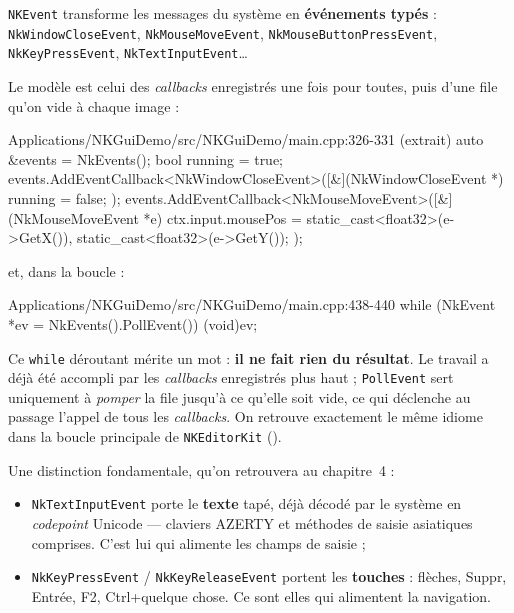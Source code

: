 \texttt{NKEvent} transforme les messages du système en \textbf{événements
typés} : \texttt{NkWindowCloseEvent}, \texttt{NkMouseMoveEvent},
\texttt{NkMouseButtonPressEvent}, \texttt{NkKeyPressEvent},
\texttt{NkTextInputEvent}\dots

Le modèle est celui des \emph{callbacks} enregistrés une fois pour toutes, puis
d'une file qu'on vide à chaque image :

\begin{nkcode}{Applications/NKGuiDemo/src/NKGuiDemo/main.cpp:326-331 (extrait)}
    auto &events = NkEvents();
    bool running = true;
    events.AddEventCallback<NkWindowCloseEvent>([&](NkWindowCloseEvent *) { running = false; });
    events.AddEventCallback<NkMouseMoveEvent>([&](NkMouseMoveEvent *e) {
        ctx.input.mousePos = {static_cast<float32>(e->GetX()), static_cast<float32>(e->GetY())};
    });
\end{nkcode}

et, dans la boucle :

\begin{nkcode}{Applications/NKGuiDemo/src/NKGuiDemo/main.cpp:438-440}
        while (NkEvent *ev = NkEvents().PollEvent()) {
            (void)ev;
        }
\end{nkcode}

Ce \texttt{while} déroutant mérite un mot : \textbf{il ne fait rien du résultat}.
Le travail a déjà été accompli par les \emph{callbacks} enregistrés plus haut ;
\texttt{PollEvent} sert uniquement à \emph{pomper} la file jusqu'à ce qu'elle
soit vide, ce qui déclenche au passage l'appel de tous les \emph{callbacks}. On
retrouve exactement le même idiome dans la boucle principale de
\texttt{NKEditorKit} ().

Une distinction fondamentale, qu'on retrouvera au chapitre~4 :

\begin{itemize}
  \item \texttt{NkTextInputEvent} porte le \textbf{texte} tapé, déjà décodé par
        le système en \emph{codepoint} Unicode — claviers AZERTY et méthodes de
        saisie asiatiques comprises. C'est lui qui alimente les champs de
        saisie ;
  \item \texttt{NkKeyPressEvent} / \texttt{NkKeyReleaseEvent} portent les
        \textbf{touches} : flèches, Suppr, Entrée, F2, Ctrl+quelque chose. Ce
        sont elles qui alimentent la navigation.
\end{itemize}

